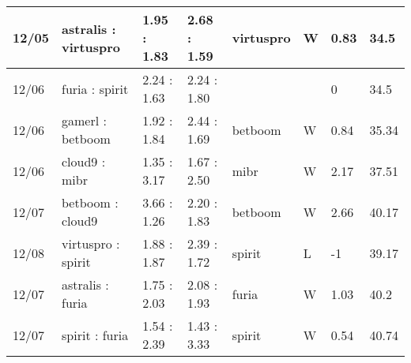 \begin{small}
\begin{longtable}{|l|l|l|l|l|l|l|l|}
	12/05                               & astralis : virtuspro                & 1.95 : 1.83                             & 2.68 : 1.59                             & virtuspro                         & W                                 & 0.83                                 & 34.5                              \\ \hline
	12/06                               & furia : spirit                      & 2.24 : 1.63                             & 2.24 : 1.80                             &                                   &                                   & 0                                    & 34.5                              \\ \hline
	12/06                               & gamerl : betboom                    & 1.92 : 1.84                             & 2.44 : 1.69                             & betboom                           & W                                 & 0.84                                 & 35.34                             \\ \hline
	12/06                               & cloud9 : mibr                       & 1.35 : 3.17                             & 1.67 : 2.50                             & mibr                              & W                                 & 2.17                                 & 37.51                             \\ \hline
	12/07                               & betboom : cloud9                    & 3.66 : 1.26                             & 2.20 : 1.83                             & betboom                           & W                                 & 2.66                                 & 40.17                             \\ \hline
	12/08                               & virtuspro : spirit                  & 1.88 : 1.87                             & 2.39 : 1.72                             & spirit                            & L                                 & -1                                   & 39.17                             \\ \hline
	12/07                               & astralis : furia                    & 1.75 : 2.03                             & 2.08 : 1.93                             & furia                             & W                                 & 1.03                                 & 40.2                              \\ \hline
	12/07                               & spirit : furia                      & 1.54 : 2.39                             & 1.43 : 3.33                             & spirit                            & W                                 & 0.54                                 & 40.74                             \\ \hline

\end{longtable}
\end{small}
